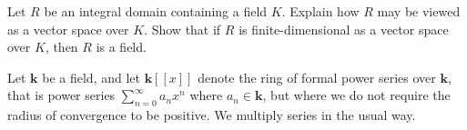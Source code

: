 \documentclass[answers]{exam}
\begin{document}
\begin{questions}



\question%
Let $R$ be an integral domain containing a field $K$. Explain how $R$ may be viewed as a vector space over $K$. Show that if $R$ is finite-dimensional as a vector space over $K$, then $R$ is a field.



\question%
Let $\mathbf{k}$ be a field, and let $\mathbf{k}[[x]]$ denote the ring of formal power series over $\mathbf{k}$, that is power series $\sum_{n=0}^{\infty} a_{n} x^{n}$ where $a_{n} \in \mathbf{k}$, but where we do not require the radius of convergence to be positive. We multiply series in the usual way.

\end{questions}
\end{document}
